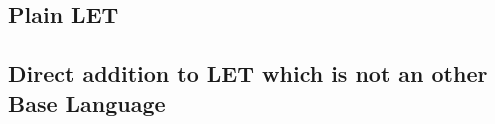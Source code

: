 \documentclass[../codeprint.tex]{subfiles}
\begin{document}
\subsection{Plain LET}



\subsection{Direct addition to LET which is not an other Base Language}
\end{document}
